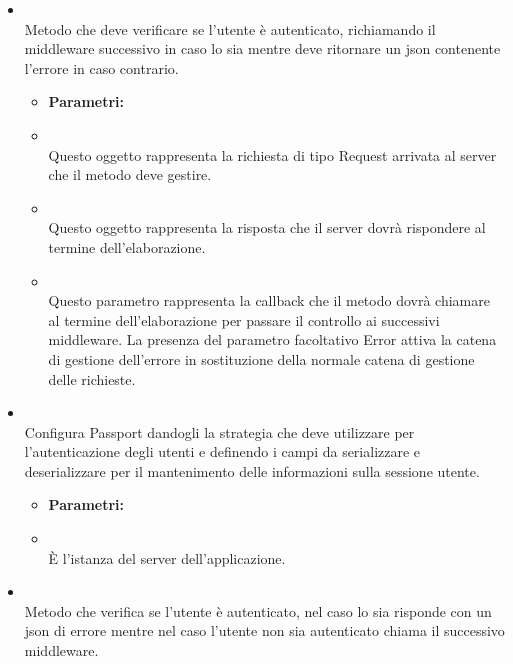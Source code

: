 \begin{itemize}
\begin{itemize}
				\end{itemize}
					\item[] \textbf{} \\ Metodo che deve verificare se l'utente è autenticato, richiamando il middleware successivo in caso lo sia mentre deve ritornare un json contenente l'errore in caso contrario.
						\begin{itemize}\addtolength{\itemsep}{-0.5\baselineskip}
						\item[] \textbf{Parametri:}
						\item[]  \\ Questo oggetto rappresenta la richiesta di tipo Request arrivata al server che il metodo deve gestire.	
						\item[]  \\ Questo oggetto rappresenta la risposta che il server dovrà rispondere al termine dell'elaborazione.	
						\item[]  \\ Questo parametro rappresenta la callback che il metodo dovrà chiamare al termine dell'elaborazione per passare il controllo ai successivi middleware. La presenza del parametro facoltativo Error attiva la catena di gestione dell'errore in sostituzione della normale catena di gestione delle richieste.	
				\end{itemize}
					\item[] \textbf{} \\ Configura Passport dandogli la strategia che deve utilizzare per l'autenticazione degli utenti e definendo i campi da serializzare e deserializzare per il mantenimento delle informazioni sulla sessione utente.
						\begin{itemize}\addtolength{\itemsep}{-0.5\baselineskip}
						\item[] \textbf{Parametri:}
						\item[]  \\ È l'istanza del server dell'applicazione.	
				\end{itemize}
					\item[] \textbf{} \\ Metodo che verifica se l'utente è autenticato, nel caso lo sia risponde con un json di errore mentre nel caso l'utente non sia autenticato chiama il successivo middleware.
						\begin{itemize}\addtolength{\itemsep}{-0.5\baselineskip}

\end{itemize}
\end{itemize}
